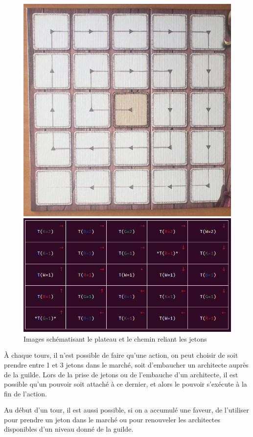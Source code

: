 \begin{figure}[H]
    \begin{minipage}[c]{0.45\textwidth}
        \centering
        \includegraphics[width=\textwidth]{img/projMunificenceBoard.png}
    \end{minipage}
    \hfill
    \begin{minipage}[c]{0.45\textwidth}
        \centering
        \includegraphics[width=\textwidth]{img/board-terminal.png}
    \end{minipage}
    \caption{Images schématisant le plateau et le chemin reliant les jetons}
    \label{fig:board_example}
\end{figure}

À chaque tours, il n'est possible de faire qu'une action, on peut choisir de soit prendre entre 1 et 3 jetons dans le marché, soit d'embaucher un architecte auprès de la guilde. Lors de la prise de jetons ou de l'embauche d'un architecte, il est possible qu'un pouvoir soit attaché à ce dernier, et alors le pouvoir s'exécute à la fin de l'action.

\begin{summary}
Au début d'un tour, il est aussi possible, si on a accumulé une faveur, de l'utiliser pour prendre un jeton dans le marché ou pour renouveler les architectes disponibles d'un niveau donné de la guilde.
\end{summary}